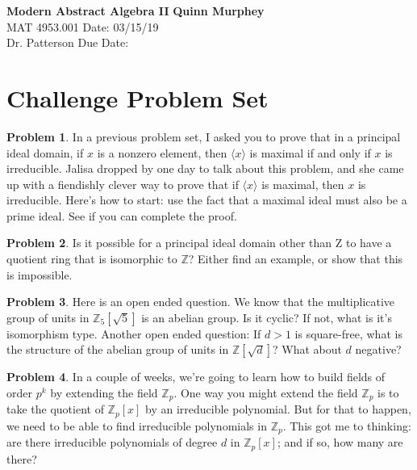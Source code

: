 \documentclass[letterpaper, 12pt]{article}
\theoremstyle{definition}
\newtheorem{problem}{Problem}
\begin{document}
\noindent
\large\textbf{Modern Abstract Algebra II} \hfill \textbf{Quinn Murphey} \\
\normalsize MAT 4953.001 \hfill Date: 03/15/19 \\
Dr. Patterson \hfill Due Date:\\
\noindent\makebox[\linewidth]{\rule{\paperwidth}{0.4pt}}

\section*{Challenge Problem Set}

\begin{problem}
    In a previous problem set, I asked you to prove that in a principal ideal domain, if $x$ is a nonzero element, then $\langle x\rangle$ is maximal if and only if $x$ is irreducible. Jalisa dropped by one day to talk about this problem, and she came up with a fiendishly clever way to prove that if $\langle x\rangle$ is maximal, then $x$ is irreducible. Here's how to start: use the fact that a maximal ideal must also be a prime ideal. See if you can complete the proof.
\end{problem}

\begin{problem}
    Is it possible for a principal ideal domain other than Z to have a quotient ring that is isomorphic to $\mathbb{Z}$? Either find an example, or show that this is impossible.
\end{problem}

\begin{problem}
    Here is an open ended question. We know that the multiplicative group of units in $\mathbb{Z}_5[\sqrt{5}]$ is an abelian group. Is it cyclic? If not, what is it's isomorphism type. Another open ended question: If $d>1$ is square-free, what is the structure of the abelian group of units in $\mathbb{Z}[\sqrt{d}]$? What about $d$ negative?
\end{problem}

\begin{problem}
    In a couple of weeks, we're going to learn how to build fields of order $p^k$ by extending the field $\mathbb{Z}_p$. One way you might extend the field $\mathbb{Z}_p$ is to take the quotient of $\mathbb{Z}_p[x]$ by an irreducible polynomial. But for that to happen, we need to be able to find irreducible polynomials in $\mathbb{Z}_p$. This got me to thinking: are there irreducible polynomials of degree $d$ in $\mathbb{Z}_p[x]$; and if so, how many are there?
\end{problem}
\end{document}
